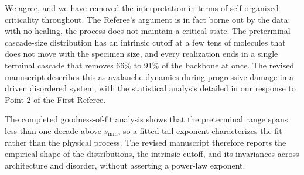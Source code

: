 \documentclass[11pt]{article}
\begin{document}
We agree, and we have removed the interpretation in terms of self-organized
criticality throughout. The Referee's argument is in fact borne out by the data:
with no healing, the process does not maintain a critical state. The preterminal
cascade-size distribution has an intrinsic cutoff at a few tens of molecules
that does not move with the specimen size, and every realization ends in a
single terminal cascade that removes 66\% to 91\% of the backbone at once. The
revised manuscript describes this as avalanche dynamics during progressive
damage in a driven disordered system, with the statistical analysis detailed in
our response to Point 2 of the First Referee.

The completed goodness-of-fit analysis shows that the preterminal range spans
less than one decade above $s_{\min}$, so a fitted tail exponent characterizes
the fit rather than the physical process. The revised manuscript therefore
reports the empirical shape of the distributions, the intrinsic cutoff, and its
invariances across architecture and disorder, without asserting a power-law
exponent.


\clearpage
\renewcommand{\refname}{References cited in the responses}

\end{document}
